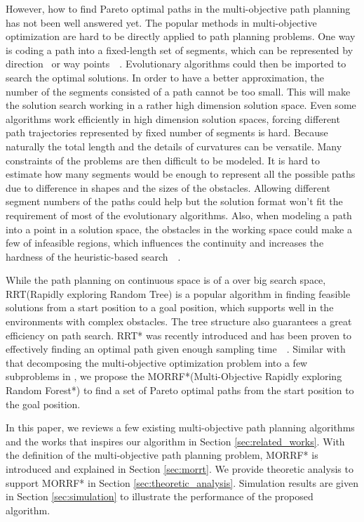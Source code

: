 \documentclass[conference]{IEEEtran}
\theoremstyle{definition}
\begin{document}
However, how to find Pareto optimal paths in the multi-objective path planning has not been well answered yet.
The popular methods in multi-objective optimization are hard to be directly applied to path planning problems.
One way is coding a path into a fixed-length set of segments, which can be represented by direction~\cite{Ahmed2013} or way points~\cite{5160222}~\cite{Pires2004}.
Evolutionary algorithms could then be imported to search the optimal solutions.
In order to have a better approximation, the number of the segments consisted of a path cannot be too small.
This will make the solution search working in a rather high dimension solution space.
Even some algorithms work efficiently in high dimension solution spaces, 
forcing different path trajectories represented by fixed number of segments is hard. 
Because naturally the total length and the details of curvatures can be versatile.
Many constraints of the problems are then difficult to be modeled.
It is hard to estimate how many segments would be enough to represent all the possible paths due to difference in shapes and the sizes of the obstacles.
Allowing different segment numbers of the paths could help but the solution format won't fit the requirement of most of the evolutionary algorithms.
Also, when modeling a path into a point in a solution space, the obstacles in the working space could make a few of infeasible regions, which influences the continuity and increases the hardness of the heuristic-based search~\cite{5160222}~\cite{4358754}.

While the path planning on continuous space is of a over big search space, 
RRT(Rapidly exploring Random Tree) is a popular algorithm in finding feasible solutions from a start position to a goal position, which supports well in the environments with complex obstacles. 
The tree structure also guarantees a great efficiency on path search.
RRT* was recently introduced and has been proven to effectively finding an optimal path given enough sampling time~\cite{Karaman:2011:SAO:2000201.2000209}~\cite{Karaman.Frazzoli:RSS10}.
Similar with that decomposing the multi-objective optimization problem into a few subproblems in \cite{4358754}, we propose the MORRF*(Multi-Objective Rapidly exploring Random Forest*) to find a set of Pareto optimal paths from the start position to the goal position.

In this paper, we reviews a few existing multi-objective path planning algorithms and the works that inspires our algorithm in Section \ref{sec:related_works}.
With the definition of the multi-objective path planning problem, MORRF* is introduced and explained in Section \ref{sec:morrt}.
We provide theoretic analysis to support MORRF* in Section \ref{sec:theoretic_analysis}.
Simulation results are given in Section \ref{sec:simulation} to illustrate the performance of the proposed algorithm.
\end{document}
